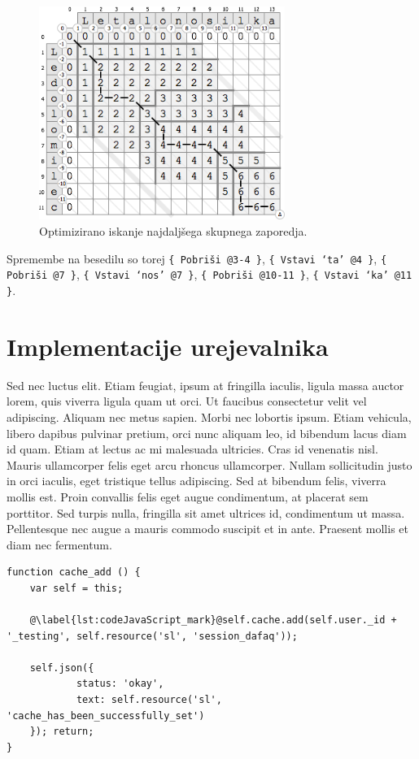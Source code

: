 \documentclass[a4paper, 12pt, twoside]{book}
\begin{document}
\begin{figure}[placement h]
\begin{center}
\includegraphics[width=8cm]{ses9.png}
\end{center}
\caption{Optimizirano iskanje najdaljšega skupnega zaporedja.}
\label{ses9}
\end{figure}

Spremembe na besedilu so torej {\tt \{ Pobriši @3-4 \}}, {\tt \{ Vstavi ‘ta’ @4 \}}, {\tt \{ Pobriši @7 \}}, {\tt \{ Vstavi ‘nos’ @7 \}}, {\tt \{ Pobriši @10-11 \}}, {\tt \{ Vstavi ‘ka’ @11 \}}.

\chapter{Implementacije urejevalnika}

Sed nec luctus elit. Etiam feugiat, ipsum at fringilla iaculis, ligula massa auctor lorem, quis viverra ligula quam ut orci. Ut faucibus consectetur velit vel adipiscing. Aliquam nec metus sapien. Morbi nec lobortis ipsum. Etiam vehicula, libero dapibus pulvinar pretium, orci nunc aliquam leo, id bibendum lacus diam id quam. Etiam at lectus ac mi malesuada ultricies. Cras id venenatis nisl. Mauris ullamcorper felis eget arcu rhoncus ullamcorper. Nullam sollicitudin justo in orci iaculis, eget tristique tellus adipiscing. Sed at bibendum felis, viverra mollis est. Proin convallis felis eget augue condimentum, at placerat sem porttitor. Sed turpis nulla, fringilla sit amet ultrices id, condimentum ut massa. Pellentesque nec augue a mauris commodo suscipit et in ante. Praesent mollis et diam nec fermentum.

\begin{lstlisting}[caption={Interdum pretium}, label={lst:codeJavaScript}, title={Exampelus \ref{lst:codeJavaScript}: Interdum pretium}]
function cache_add () {
	var self = this;

	@\label{lst:codeJavaScript_mark}@self.cache.add(self.user._id + '_testing', self.resource('sl', 'session_dafaq'));

	self.json({
			status: 'okay',
			text: self.resource('sl', 'cache_has_been_successfully_set')
	}); return;
}
\end{lstlisting}
\end{document}
